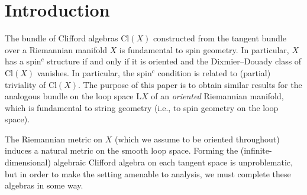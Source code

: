 \documentclass[pdftex]{sigma}
\numberwithin{equation}{section}
\newcommand{\Cl}{\mathrm{Cl}}
\renewcommand{\L}{\mathrm{L}}
\begin{document}
\allowdisplaybreaks

\newcommand{\arXivNumber}{2204.00798}

\renewcommand{\PaperNumber}{020}

\FirstPageHeading










\section{Introduction}

The bundle of Clifford algebras $\Cl(X)$ constructed from the tangent bundle over a Riemannian manifold $X$ is fundamental to spin geometry.
In particular, $X$ has a spin$^c$ structure if and only if it is oriented and the Dixmier--Douady class of $\Cl(X)$ vanishes.
In particular, the spin$^c$ condition is related to (partial) triviality of $\Cl(X)$.
The purpose of this paper is to obtain similar results for the analogous bundle on the loop space $\L X$ of an \emph{oriented} Riemannian manifold, which is fundamental to string geometry (i.e., to spin geometry on the loop space).

The Riemannian metric on $X$ (which we assume to be oriented throughout) induces a natural metric on the smooth loop space.
Forming the (infinite-dimensional) algebraic Clifford algebra on each tangent space is unproblematic, but in order to make the setting amenable to analysis, we must complete these algebras in some way.
\end{document}
